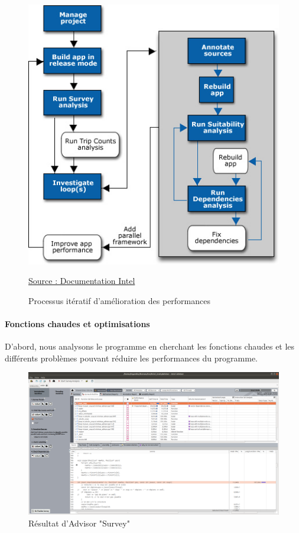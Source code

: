 \documentclass[
 aip,
 jmp,
 amsmath,amssymb,
 reprint
]{revtex4-1}
\begin{document}
\begin{figure}[H]
  \includegraphics[width=\linewidth, keepaspectratio=true]{Intel.jpg}
  \centering
  \caption{Processus itératif d'amélioration des performances\label{Fig:intel_processes}}{\href{https://software.intel.com/en-us/node/684712}{Source : Documentation Intel}}
\end{figure}

\paragraph{Fonctions chaudes et optimisations}
D'abord, nous analysons le programme en cherchant les fonctions chaudes et les différents problèmes pouvant réduire les performances du programme.

\begin{figure}[H]
  \includegraphics[width=\linewidth, keepaspectratio=true]{survey.png}
  \caption{Résultat d'Advisor "Survey"\label{Fig:advisor_survey}}
\end{figure}
\end{document}
